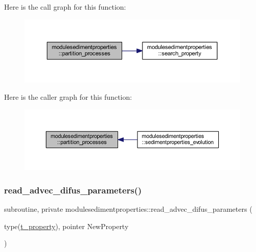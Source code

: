 Here is the call graph for this function\+:\nopagebreak
\begin{figure}[H]
\begin{center}
\leavevmode
\includegraphics[width=350pt]{namespacemodulesedimentproperties_a28bead70b224e32b9105e7f44858867d_cgraph}
\end{center}
\end{figure}
Here is the caller graph for this function\+:\nopagebreak
\begin{figure}[H]
\begin{center}
\leavevmode
\includegraphics[width=350pt]{namespacemodulesedimentproperties_a28bead70b224e32b9105e7f44858867d_icgraph}
\end{center}
\end{figure}
\mbox{\label{namespacemodulesedimentproperties_ae4b16a3890a8718b83545926394da139}} 
\subsubsection{\texorpdfstring{read\+\_\+advec\+\_\+difus\+\_\+parameters()}{read\_advec\_difus\_parameters()}}
{\footnotesize\ttfamily subroutine, private modulesedimentproperties\+::read\+\_\+advec\+\_\+difus\+\_\+parameters (\begin{DoxyParamCaption}\item[{type(\mbox{\hyperlink{structmodulesedimentproperties_1_1t__property}{t\+\_\+property}}), pointer}]{New\+Property }\end{DoxyParamCaption})\hspace{0.3cm}{\ttfamily [private]}}

